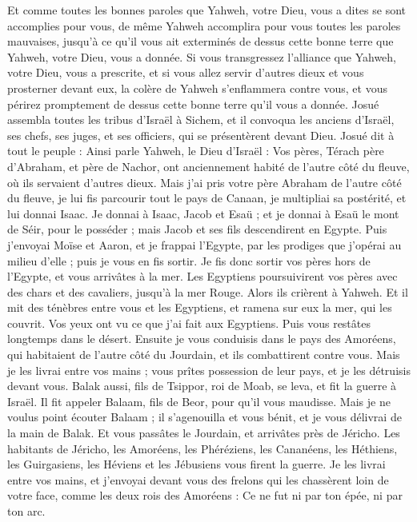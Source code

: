 \begin{multicols}{2}
Et comme toutes les bonnes paroles que Yahweh, votre Dieu, vous a dites se sont accomplies pour vous, de même Yahweh accomplira pour vous toutes les paroles mauvaises, jusqu’à ce qu’il vous ait exterminés de dessus cette bonne terre que Yahweh, votre Dieu, vous a donnée.
Si vous transgressez l’alliance que Yahweh, votre Dieu, vous a prescrite, et si vous allez servir d’autres dieux et vous prosterner devant eux, la colère de Yahweh s’enflammera contre vous, et vous périrez promptement de dessus cette bonne terre qu’il vous a donnée.
\VerseOne{}Josué assembla toutes les tribus d’Israël à Sichem, et il convoqua les anciens d’Israël, ses chefs, ses juges, et ses officiers, qui se présentèrent devant Dieu.
Josué dit à tout le peuple : Ainsi parle Yahweh, le Dieu d’Israël : Vos pères, Térach père d’Abraham, et père de Nachor, ont anciennement habité de l’autre côté du fleuve, où ils servaient d’autres dieux.
Mais j’ai pris votre père Abraham de l’autre côté du fleuve, je lui fis parcourir tout le pays de Canaan, je multipliai sa postérité, et lui donnai Isaac.
Je donnai à Isaac, Jacob et Esaü ; et je donnai à Esaü le mont de Séir, pour le posséder ; mais Jacob et ses fils descendirent en Egypte.
Puis j’envoyai Moïse et Aaron, et je frappai l’Egypte, par les prodiges que j’opérai au milieu d’elle ; puis je vous en fis sortir.
Je fis donc sortir vos pères hors de l’Egypte, et vous arrivâtes à la mer. Les Egyptiens poursuivirent vos pères avec des chars et des cavaliers, jusqu’à la mer Rouge.
Alors ils crièrent à Yahweh. Et il mit des ténèbres entre vous et les Egyptiens, et ramena sur eux la mer, qui les couvrit. Vos yeux ont vu ce que j’ai fait aux Egyptiens. Puis vous restâtes longtemps dans le désert.
Ensuite je vous conduisis dans le pays des Amoréens, qui habitaient de l’autre côté du Jourdain, et ils combattirent contre vous. Mais je les livrai entre vos mains ; vous prîtes possession de leur pays, et je les détruisis devant vous.
Balak\FTNT{} aussi, fils de Tsippor, roi de Moab, se leva, et fit la guerre à Israël. Il fit appeler Balaam\FTNT{}, fils de Beor, pour qu’il vous maudisse.
Mais je ne voulus point écouter Balaam ; il s’agenouilla et vous bénit, et je vous délivrai de la main de Balak.
Et vous passâtes le Jourdain, et arrivâtes près de Jéricho. Les habitants de Jéricho, les Amoréens, les Phéréziens, les Cananéens, les Héthiens, les Guirgasiens, les Héviens et les Jébusiens vous firent la guerre. Je les livrai entre vos mains,
et j’envoyai devant vous des frelons qui les chassèrent loin de votre face, comme les deux rois des Amoréens : Ce ne fut ni par ton épée, ni par ton arc.

\end{multicols}
